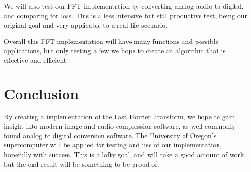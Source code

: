 \documentclass[12pt]{extarticle}
\begin{document}
	We will also test our FFT implementation by converting analog audio to digital, and comparing for loss. 
	This is a less intensive but still productive test, being our original goal and very applicable to a real life scenario. 
	
	Overall this FFT implementation will have many functions and possible applications, but only testing a few we hope to create an algorithm that is effective and efficient.

\section*{Conclusion}
	By creating a implementation of the Fast Fourier Transform, we hope to gain insight into modern image and audio compression software, as well commonly found analog to digital conversion software.
	The University of Oregon's supercomputer will be applied for testing and use of our implementation, hopefully with success.
	This is a lofty goal, and will take a good amount of work, but the end result will be something to be proud of.


\end{document}
